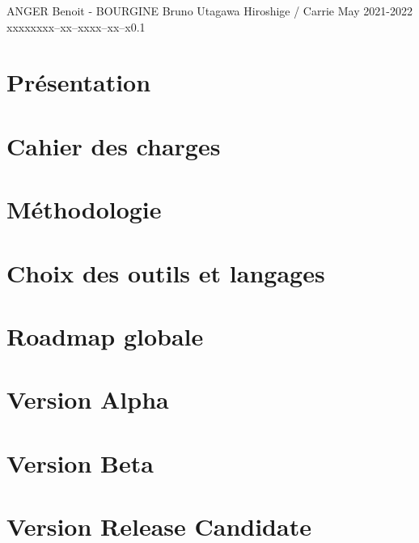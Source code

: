 \documentclass{tstextbook}
\begin{document}
       {ANGER Benoit - BOURGINE Bruno}
       {Utagawa Hiroshige / Carrie May}
       {2021-2022}
       {xxxxx}{xxx--xx--xxxx--xx--x}{0.1}
       {}
       {}



\chapter{Présentation}


\chapter{Cahier des charges}


\chapter{Méthodologie}


\chapter{Choix des outils et langages}



\chapter{Roadmap globale}


\chapter{Version Alpha}


\chapter{Version Beta}


\chapter{Version Release Candidate}

\end{document}
